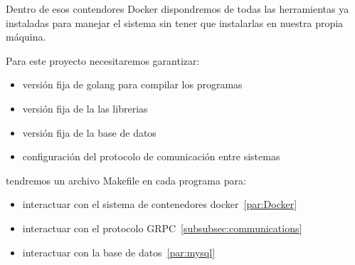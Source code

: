Dentro de esos contendores Docker dispondremos de todas las herramientas ya instaladas para manejar el sistema sin tener que instalarlas en nuestra propia máquina.

Para este proyecto necesitaremos garantizar:

\begin{itemize}
    \item versión fija de golang para compilar los programas
    \item versión fija de la las librerias
    \item versión fija de la base de datos
    \item configuración del protocolo de comunicación entre sistemas
\end{itemize}

tendremos un archivo Makefile en cada programa para:

\begin{itemize}
    \item interactuar con el sistema de contenedores docker~\ref{par:Docker}
    \item interactuar con el protocolo GRPC~\ref{subsubsec:communications}
    \item interactuar con la base de datos~\ref{par:mysql}
\end{itemize}



